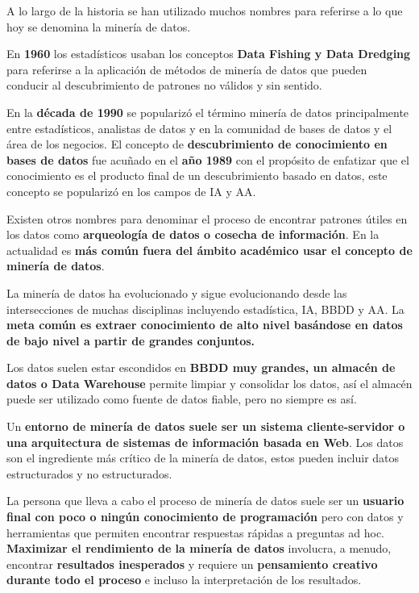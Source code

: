 \documentclass[12pt, twoside, openright]{report} %
\begin{document}
A lo largo de la historia se han utilizado muchos nombres para referirse a lo que hoy se denomina la minería de datos.

En \textbf{1960} los estadísticos usaban los conceptos \textbf{Data Fishing y Data Dredging} para referirse a la aplicación de métodos de minería de datos que pueden conducir al descubrimiento de patrones no válidos y sin sentido.

En la \textbf{década de 1990} se popularizó el término minería de datos principalmente entre estadísticos, analistas de datos y en la comunidad de bases de datos y el área de los negocios. El concepto de \textbf{descubrimiento de conocimiento en bases de datos} fue acuñado en el \textbf{año 1989} con el propósito de enfatizar que el conocimiento es el producto final de un descubrimiento basado en datos, este concepto se popularizó en los campos de IA y AA.

Existen otros nombres para denominar el proceso de encontrar patrones útiles en los datos como \textbf{arqueología de datos o cosecha de información}. En la actualidad es \textbf{más común fuera del ámbito académico usar el concepto de minería de datos}.

La minería de datos ha evolucionado y sigue evolucionando desde las intersecciones de muchas disciplinas incluyendo estadística, IA, BBDD y AA. La \textbf{meta común es extraer conocimiento de alto nivel basándose en datos de bajo nivel a partir de grandes conjuntos.}

Los datos suelen estar escondidos en \textbf{BBDD muy grandes, un almacén de datos o Data Warehouse} permite limpiar y consolidar los datos, así el almacén puede ser utilizado como fuente de datos fiable, pero no siempre es así.

Un \textbf{entorno de minería de datos suele ser un sistema cliente-servidor o una arquitectura de sistemas de información basada en Web}. Los datos son el ingrediente más crítico de la minería de datos, estos pueden incluir datos estructurados y no estructurados.

La persona que lleva a cabo el proceso de minería de datos suele ser un \textbf{usuario final con poco o ningún conocimiento de programación} pero con datos y herramientas que permiten encontrar respuestas rápidas a preguntas ad hoc. \textbf{Maximizar el rendimiento de la minería de datos} involucra, a menudo, encontrar \textbf{resultados inesperados} y requiere un \textbf{pensamiento creativo durante todo el proceso} e incluso la interpretación de los resultados.
\end{document}

